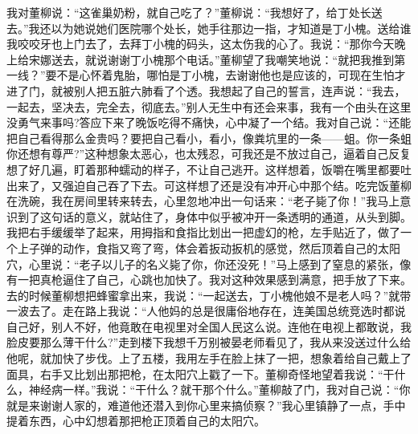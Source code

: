 \documentclass[12pt,oneside]{book}
\begin{document}
我对董柳说：``这雀巢奶粉，就自己吃了？''董柳说：``我想好了，给丁处长送去。''我还以为她说她们医院哪个处长，她手往那边一指，才知道是丁小槐。送给谁我咬咬牙也上门去了，去拜丁小槐的码头，这太伤我的心了。我说：``那你今天晚上给宋娜送去，就说谢谢丁小槐那个电话。''董柳望了我嘲笑地说：``就把我推到第一线？''要不是心怀着鬼胎，哪怕是丁小槐，去谢谢他也是应该的，可现在生怕才进了门，就被别人把五脏六肺看了个透。我想起了自己的誓言，连声说：``我去，一起去，坚决去，完全去，彻底去。''别人无生中有还会来事，我有一个由头在这里没勇气来事吗?答应下来了晚饭吃得不痛快，心中凝了一个结。我对自己说：``还能把自己看得那么金贵吗？要把自己看小，看小，像粪坑里的一条------蛆。你一条蛆你还想有尊严?''这种想象太恶心，也太残忍，可我还是不放过自己，逼着自己反复想了好几遍，盯着那种蠕动的样子，不让自己逃开。这样想着，饭嚼在嘴里都要吐出来了，又强迫自己吞了下去。可这样想了还是没有冲开心中那个结。吃完饭董柳在洗碗，我在房间里转来转去，心里忽地冲出一句话来：``老子毙了你！''我马上意识到了这句话的意义，就站住了，身体中似乎被冲开一条透明的通道，从头到脚。我把右手缓缓举了起来，用拇指和食指比划出一把虚幻的枪，左手贴近了，做了一个上子弹的动作，食指又弯了弯，体会着扳动扳机的感觉，然后顶着自己的太阳穴，心里说：``老子以儿子的名义毙了你，你还没死！''马上感到了窒息的紧张，像有一把真枪逼住了自己，心跳也加快了。我对这种效果感到满意，把手放了下来。去的时候董柳想把蜂蜜拿出来，我说：``一起送去，丁小槐他娘不是老人吗？''就带一波去了。走在路上我说：``人他妈的总是很庸俗地存在，连美国总统竞选时都说自己好，别人不好，他竟敢在电视里对全国人民这么说。连他在电视上都敢说，我脸皮要那么薄干什么?''走到楼下我想千万别被晏老师看见了，我从来没送过什么给他呢，就加快了步伐。上了五楼，我用左手在脸上抹了一把，想象着给自己戴上了面具，右手又比划出那把枪，在太阳穴上戳了一下。董柳奇怪地望着我说：``干什么，神经病一样。''我说：``干什么？就干那个什么。''董柳敲了门，我对自己说：``你就是来谢谢人家的，难道他还潜入到你心里来搞侦察？''我心里镇静了一点，手中提着东西，心中幻想着那把枪正顶着自己的太阳穴。
\end{document}
